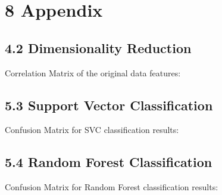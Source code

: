 \documentclass{article}
\begin{document}
\setcounter{page}{12}
\section*{8 \space Appendix}

\subsection*{4.2 \space Dimensionality Reduction}
Correlation Matrix of the original data features:\\

\begin{center}
  \hspace*{-0.05\linewidth}
  
\end{center}

\newpage
\subsection*{5.3 \space Support Vector Classification}
Confusion Matrix for SVC classification results:
\begin{center}
  \hspace*{-0.05\linewidth}
  
\end{center}

\newpage
\subsection*{5.4 \space Random Forest Classification}
Confusion Matrix for Random Forest classification results:
\begin{center}
  \hspace*{-0.05\linewidth}
  
\end{center}



\newpage
\end{document}

